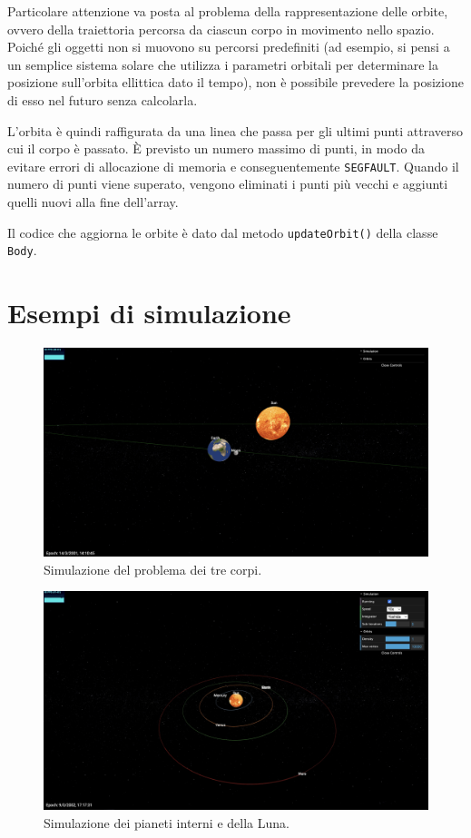 \documentclass[11pt]{article}
\begin{document}
	Particolare attenzione va posta al problema della rappresentazione delle orbite, ovvero della traiettoria percorsa da ciascun corpo in movimento nello spazio. Poiché gli oggetti non si muovono su percorsi predefiniti (ad esempio, si pensi a un semplice sistema solare che utilizza i parametri orbitali per determinare la posizione sull'orbita ellittica dato il tempo), non è possibile prevedere la posizione di esso nel futuro senza calcolarla.

	L'orbita è quindi raffigurata da una linea che passa per gli ultimi punti attraverso cui il corpo è passato. È previsto un numero massimo di punti, in modo da evitare errori di allocazione di memoria e conseguentemente \texttt{SEGFAULT}. Quando il numero di punti viene superato, vengono eliminati i punti più vecchi e aggiunti quelli nuovi alla fine dell'array.

	Il codice che aggiorna le orbite è dato dal metodo \texttt{updateOrbit()} della classe \texttt{Body}.

	\section{Esempi di simulazione}

	\begin{figure}[H]
		\centering
		\includegraphics[width=\linewidth]{simulation_three_bodies}
		\caption{Simulazione del problema dei tre corpi.}
	\end{figure}

	\begin{figure}[H]
		\centering
		\includegraphics[width=\linewidth]{simulation_inner_planets}
		\caption{Simulazione dei pianeti interni e della Luna.}
	\end{figure}
\end{document}
